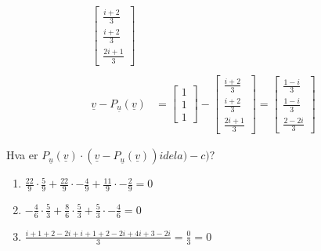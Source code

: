 \documentclass[11pt, a4paper, norsk]{NTNUoving}
\begin{document}
\begin{oppgave}
\begin{punkt}
\begin{align*}
\begin{bmatrix}
                             \frac{i+2}{3} \\
                             \frac{i+2}{3} \\
                             \frac{2i+1}{3}
                         \end{bmatrix}
                         \\
                         \\
                    \underline{v} - P_{\underline{u}}(\underline{v}) &= \begin{bmatrix}
                        1 \\
                        1 \\
                        1
                    \end{bmatrix} - \begin{bmatrix}
                        \frac{i+2}{3} \\
                        \frac{i+2}{3} \\
                        \frac{2i+1}{3}
                    \end{bmatrix} = \begin{bmatrix}
                        \frac{1-i}{3} \\
                        \frac{1-i}{3} \\
                        \frac{2-2i}{3}
                    \end{bmatrix}
            \end{align*} 
        \end{punkt}
        \begin{punkt}
            Hva er $P_{\underline{u}}(\underline{v}) \cdot (\underline{v} - P_{\underline{u}}(\underline{v})) i del a)-c)?$
            \begin{enumerate}
                \item $\frac{22}{9} \cdot \frac{5}{9} + \frac{22}{9} \cdot -\frac{4}{9} + \frac{11}{9} \cdot -\frac{2}{9} = 0$
                \item $-\frac{4}{6} \cdot \frac{5}{3} + \frac{8}{6} \cdot \frac{5}{3} + \frac{5}{3} \cdot -\frac{4}{6} = 0$
                \item $\frac{i+1+2-2i+i+1+2-2i+4i+3-2i}{3} = \frac{0}{3} = 0$
            \end{enumerate}
        \end{punkt}
    \end{oppgave}
\end{document}
